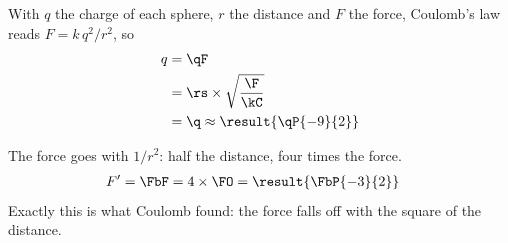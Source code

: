 \begin{abcliste}
\abc With $q$ the charge of each sphere, $r$ the distance and $F$ the force, Coulomb's law reads $F = k\,q^2/r^2$, so
\begin{align}
 q &= \qF \\
   &= \rs\times\sqrt{\frac{\F}{\kC}} \\
   &= \q \approx \result{\qP{-9}{2}}
\end{align}

\abc The force goes with $1/r^2$: half the distance, four times the force.
\begin{align}
 F' &= \FbF = 4\times\FO = \result{\FbP{-3}{2}}
\end{align}
Exactly this is what Coulomb found: the force falls off with the square of the distance.
\end{abcliste}
